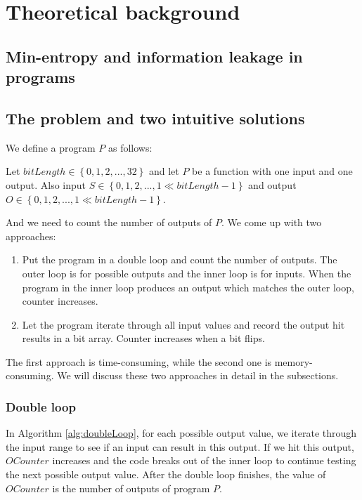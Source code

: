 

\chapter{Theoretical background}
	\label{CH_02}

\section{Min-entropy and information leakage in programs}


\section{The problem and two intuitive solutions}
We define a program $P$ as follows:
\begin{mydef}
Let $bitLength\in \left\{ {0,1,2,..., 32}\right\}$ and let $P$ be a function with one input and one output. Also input $S \in \left\{ {0,1,2,..., 1\ll bitLength-1}\right\}$ and output $O \in \left\{ {0,1,2,..., 1\ll bitLength-1}\right\}$.
\end{mydef}

And we need to count the number of outputs of $P$. We come up with two approaches: 

\begin{enumerate}
\item Put the program in a double loop and count the number of outputs. The outer loop is for possible outputs and the inner loop is for inputs. When the program in the inner loop produces an output which matches the outer loop, counter increases.
\item Let the program iterate through all input values and record the output hit results in a bit array. Counter increases when a bit flips.
\end{enumerate}

The first approach is time-consuming, while the second one is memory-consuming. We will discuss these two approaches in detail in the subsections.

\subsection{Double loop}
In Algorithm \ref{alg:doubleLoop}, for each possible output value, we iterate through the input range to see if an input can result in this output. If we hit this output, $OCounter$ increases and the code breaks out of the inner loop to continue testing the next possible output value. After the double loop finishes, the value of $OCounter$ is the number of outputs of program $P$.


